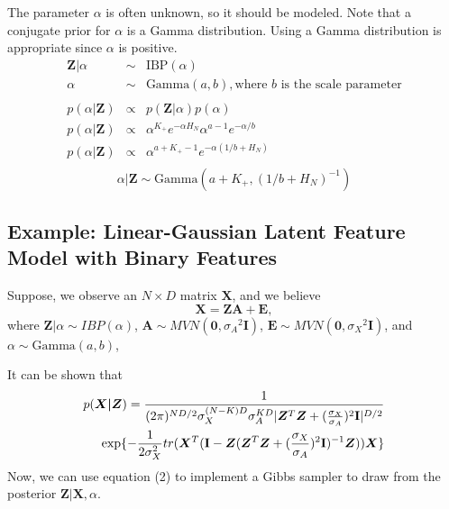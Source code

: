 \noindent
The parameter $\alpha$ is often unknown, so it should be modeled. Note that a
conjugate prior for $\alpha$ is a Gamma distribution. Using a Gamma
distribution is appropriate since $\alpha$ is positive.
\[
  \begin{array}{rcl}
    \bm Z|\alpha & \sim & \text{IBP}(\alpha)\\
          \alpha & \sim & \text{Gamma}(a,b), \text{where $b$ is the scale parameter}\\
    & & \\
    p(\alpha|\bm Z) & \propto & p(\bm Z|\alpha) p(\alpha)\\
    p(\alpha|\bm Z) & \propto & \alpha^{K_+} e^{-\alpha H_N}  
                                \alpha^{a-1} e^{-\alpha/b}\\
    p(\alpha|\bm Z) & \propto & \alpha^{a+K_+-1} e^{-\alpha(1/b+H_N)}\\
  \end{array}
\]
\begin{equation}
  \alpha|\bm Z  \sim  \text{Gamma}(a+K_+, (1/b+H_N)^{-1})
\end{equation}

\subsection{Example: Linear-Gaussian Latent Feature Model with Binary Features}
Suppose, we observe an $N \times D$ matrix $\bm X$, and we believe
\[
  \bm X = \bm{ZA} + \bm E,
\]
where $\bm Z|\alpha \sim IBP(\alpha)$, 
$\bm A \sim MVN(\bm 0,{\sigma_A}^2\textbf{I})$, 
$\bm E \sim MVN(\bm 0,{\sigma_X}^2\textbf{I})$, and
$\alpha \sim \text{Gamma}(a,b)$,

\noindent
It can be shown that
\begin{equation}\begin{split}  
  p(\bm{X|Z}) = \displaystyle\frac{1}{(2\pi)^{ND/2}\sigma_X^{(N-K)D}\sigma_A^{KD}
                            |\bm Z^T \bm Z+({\frac{\sigma_X}{\sigma_A}})^2
                            \textbf{I}|^{D/2}}\\
                \exp\{-\frac{1}{2\sigma_X^2}tr(\bm X^T
                (\textbf{I}-\bm Z(\bm Z^T\bm Z+({\frac{\sigma_X}{\sigma_A}})^2
                            \textbf{I})^{-1}\bm Z))
                \bm X\}            
\end{split}\end{equation}
Now, we can use equation (2) to implement a Gibbs sampler to draw from the 
posterior $\bm{Z|X},\alpha$.

